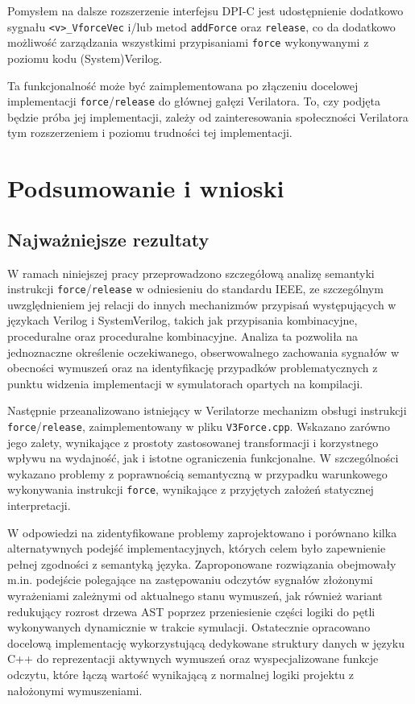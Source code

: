 \documentclass[shortabstract, inz]{iithesis}
\newcounter{kod}[chapter]
\begin{document}
Pomysłem na dalsze rozszerzenie interfejsu DPI-C jest udostępnienie dodatkowo sygnału \texttt{<v>\_VforceVec} i/lub metod \texttt{addForce} oraz \texttt{release}, co da dodatkowo możliwość zarządzania wszystkimi przypisaniami \texttt{force} wykonywanymi z poziomu kodu (System)Verilog.

Ta funkcjonalność może być zaimplementowana po złączeniu docelowej implementacji \texttt{force}/\texttt{release} do głównej gałęzi Verilatora. To, czy podjęta będzie próba jej implementacji, zależy od zainteresowania społeczności Verilatora tym rozszerzeniem i poziomu trudności tej implementacji.

\chapter{Podsumowanie i wnioski}
\section{Najważniejsze rezultaty}

W ramach niniejszej pracy przeprowadzono szczegółową analizę semantyki instrukcji \texttt{force}/\texttt{release} w odniesieniu do standardu IEEE, ze szczególnym uwzględnieniem jej relacji do innych mechanizmów przypisań występujących w językach Verilog i SystemVerilog, takich jak przypisania kombinacyjne, proceduralne oraz proceduralne kombinacyjne. Analiza ta pozwoliła na jednoznaczne określenie oczekiwanego, obserwowalnego zachowania sygnałów w obecności wymuszeń oraz na identyfikację przypadków problematycznych z punktu widzenia implementacji w symulatorach opartych na kompilacji.

Następnie przeanalizowano istniejący w Verilatorze mechanizm obsługi instrukcji \texttt{force}/\texttt{release}, zaimplementowany w pliku \texttt{V3Force.cpp}. Wskazano zarówno jego zalety, wynikające z prostoty zastosowanej transformacji i korzystnego wpływu na wydajność, jak i istotne ograniczenia funkcjonalne. W szczególności wykazano problemy z poprawnością semantyczną w przypadku warunkowego wykonywania instrukcji \texttt{force}, wynikające z przyjętych założeń statycznej interpretacji.

W odpowiedzi na zidentyfikowane problemy zaprojektowano i porównano kilka alternatywnych podejść implementacyjnych, których celem było zapewnienie pełnej zgodności z semantyką języka. Zaproponowane rozwiązania obejmowały m.in. podejście polegające na zastępowaniu odczytów sygnałów złożonymi wyrażeniami zależnymi od aktualnego stanu wymuszeń, jak również wariant redukujący rozrost drzewa AST poprzez przeniesienie części logiki do pętli wykonywanych dynamicznie w trakcie symulacji. Ostatecznie opracowano docelową implementację wykorzystującą dedykowane struktury danych w języku C++ do reprezentacji aktywnych wymuszeń oraz wyspecjalizowane funkcje odczytu, które łączą wartość wynikającą z normalnej logiki projektu z nałożonymi wymuszeniami.
\end{document}
